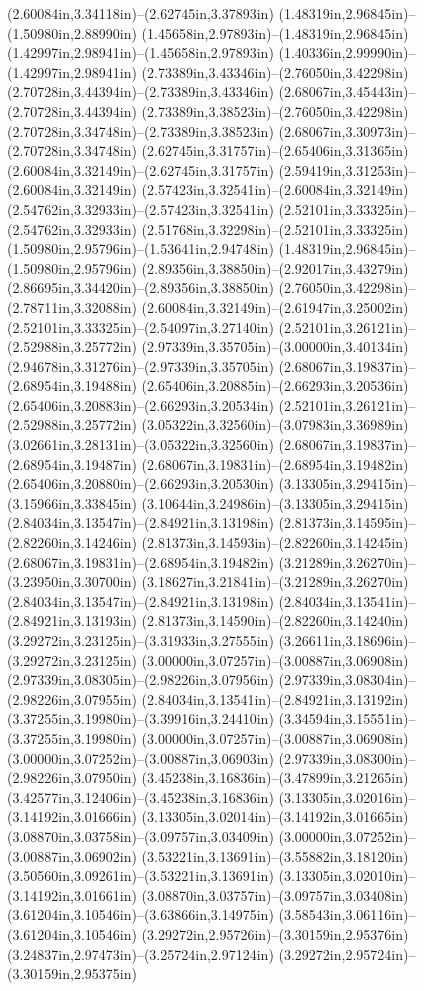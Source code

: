 (2.60084in,3.34118in)--(2.62745in,3.37893in) (1.48319in,2.96845in)--(1.50980in,2.88990in) (1.45658in,2.97893in)--(1.48319in,2.96845in) (1.42997in,2.98941in)--(1.45658in,2.97893in) (1.40336in,2.99990in)--(1.42997in,2.98941in) (2.73389in,3.43346in)--(2.76050in,3.42298in) (2.70728in,3.44394in)--(2.73389in,3.43346in) (2.68067in,3.45443in)--(2.70728in,3.44394in) (2.73389in,3.38523in)--(2.76050in,3.42298in) (2.70728in,3.34748in)--(2.73389in,3.38523in) (2.68067in,3.30973in)--(2.70728in,3.34748in) (2.62745in,3.31757in)--(2.65406in,3.31365in) (2.60084in,3.32149in)--(2.62745in,3.31757in) (2.59419in,3.31253in)--(2.60084in,3.32149in) (2.57423in,3.32541in)--(2.60084in,3.32149in) (2.54762in,3.32933in)--(2.57423in,3.32541in) (2.52101in,3.33325in)--(2.54762in,3.32933in) (2.51768in,3.32298in)--(2.52101in,3.33325in) (1.50980in,2.95796in)--(1.53641in,2.94748in) (1.48319in,2.96845in)--(1.50980in,2.95796in) (2.89356in,3.38850in)--(2.92017in,3.43279in) (2.86695in,3.34420in)--(2.89356in,3.38850in) (2.76050in,3.42298in)--(2.78711in,3.32088in) (2.60084in,3.32149in)--(2.61947in,3.25002in) (2.52101in,3.33325in)--(2.54097in,3.27140in) (2.52101in,3.26121in)--(2.52988in,3.25772in) (2.97339in,3.35705in)--(3.00000in,3.40134in) (2.94678in,3.31276in)--(2.97339in,3.35705in) (2.68067in,3.19837in)--(2.68954in,3.19488in) (2.65406in,3.20885in)--(2.66293in,3.20536in) (2.65406in,3.20883in)--(2.66293in,3.20534in) (2.52101in,3.26121in)--(2.52988in,3.25772in) (3.05322in,3.32560in)--(3.07983in,3.36989in) (3.02661in,3.28131in)--(3.05322in,3.32560in) (2.68067in,3.19837in)--(2.68954in,3.19487in) (2.68067in,3.19831in)--(2.68954in,3.19482in) (2.65406in,3.20880in)--(2.66293in,3.20530in) (3.13305in,3.29415in)--(3.15966in,3.33845in) (3.10644in,3.24986in)--(3.13305in,3.29415in) (2.84034in,3.13547in)--(2.84921in,3.13198in) (2.81373in,3.14595in)--(2.82260in,3.14246in) (2.81373in,3.14593in)--(2.82260in,3.14245in) (2.68067in,3.19831in)--(2.68954in,3.19482in) (3.21289in,3.26270in)--(3.23950in,3.30700in) (3.18627in,3.21841in)--(3.21289in,3.26270in) (2.84034in,3.13547in)--(2.84921in,3.13198in) (2.84034in,3.13541in)--(2.84921in,3.13193in) (2.81373in,3.14590in)--(2.82260in,3.14240in) (3.29272in,3.23125in)--(3.31933in,3.27555in) (3.26611in,3.18696in)--(3.29272in,3.23125in) (3.00000in,3.07257in)--(3.00887in,3.06908in) (2.97339in,3.08305in)--(2.98226in,3.07956in) (2.97339in,3.08304in)--(2.98226in,3.07955in) (2.84034in,3.13541in)--(2.84921in,3.13192in) (3.37255in,3.19980in)--(3.39916in,3.24410in) (3.34594in,3.15551in)--(3.37255in,3.19980in) (3.00000in,3.07257in)--(3.00887in,3.06908in) (3.00000in,3.07252in)--(3.00887in,3.06903in) (2.97339in,3.08300in)--(2.98226in,3.07950in) (3.45238in,3.16836in)--(3.47899in,3.21265in) (3.42577in,3.12406in)--(3.45238in,3.16836in) (3.13305in,3.02016in)--(3.14192in,3.01666in) (3.13305in,3.02014in)--(3.14192in,3.01665in) (3.08870in,3.03758in)--(3.09757in,3.03409in) (3.00000in,3.07252in)--(3.00887in,3.06902in) (3.53221in,3.13691in)--(3.55882in,3.18120in) (3.50560in,3.09261in)--(3.53221in,3.13691in) (3.13305in,3.02010in)--(3.14192in,3.01661in) (3.08870in,3.03757in)--(3.09757in,3.03408in) (3.61204in,3.10546in)--(3.63866in,3.14975in) (3.58543in,3.06116in)--(3.61204in,3.10546in) (3.29272in,2.95726in)--(3.30159in,2.95376in) (3.24837in,2.97473in)--(3.25724in,2.97124in) (3.29272in,2.95724in)--(3.30159in,2.95375in) 